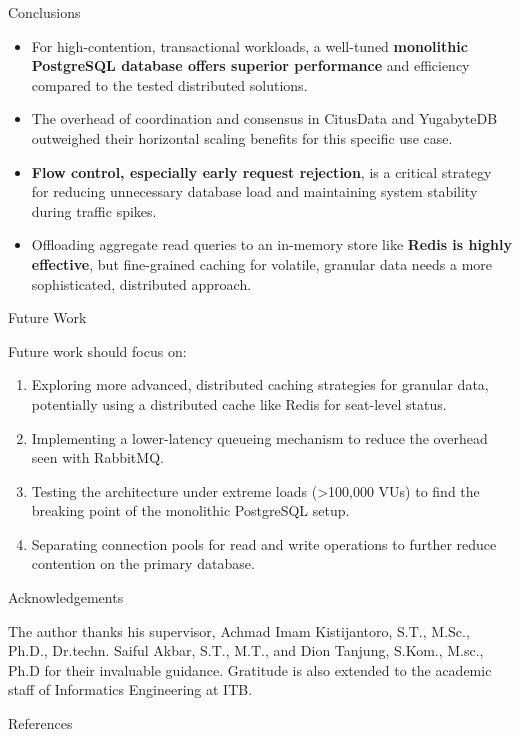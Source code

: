\documentclass[a0,landscape]{config/poster/a0poster}
\newcommand{\postersection}[1]{%
  \begin{tcolorbox}[
    colback=IEEEblue,
    colframe=IEEEblue,
    fonttitle=\bfseries,
    coltext=white,
    sharp corners,
    boxrule=0pt,
    top=4pt,
    bottom=4pt,
    halign=center
  ]
    \large #1
  \end{tcolorbox}%
}
\begin{document}
\begin{multicols}{4}

    \columnbreak

    \postersection{Conclusions}
    \begin{itemize}
        \item For high-contention, transactional workloads, a well-tuned \textbf{monolithic PostgreSQL database offers superior performance} and efficiency compared to the tested distributed solutions.
        \item The overhead of coordination and consensus in CitusData and YugabyteDB outweighed their horizontal scaling benefits for this specific use case.
        \item \textbf{Flow control, especially early request rejection}, is a critical strategy for reducing unnecessary database load and maintaining system stability during traffic spikes.
        \item Offloading aggregate read queries to an in-memory store like \textbf{Redis is highly effective}, but fine-grained caching for volatile, granular data needs a more sophisticated, distributed approach.
    \end{itemize}


    \postersection{Future Work}
    Future work should focus on:
    \begin{enumerate}
        \item Exploring more advanced, distributed caching strategies for granular data, potentially using a distributed cache like Redis for seat-level status.
        \item Implementing a lower-latency queueing mechanism to reduce the overhead seen with RabbitMQ.
        \item Testing the architecture under extreme loads (\textgreater100,000 VUs) to find the breaking point of the monolithic PostgreSQL setup.
        \item Separating connection pools for read and write operations to further reduce contention on the primary database.
    \end{enumerate}

    \postersection{Acknowledgements}
    The author thanks his supervisor, Achmad Imam Kistijantoro, S.T., M.Sc., Ph.D., Dr.techn. Saiful Akbar, S.T., M.T., and Dion Tanjung, S.Kom., M.sc., Ph.D for their invaluable guidance. Gratitude is also extended to the academic staff of Informatics Engineering at ITB.


    \postersection{References}
    \printbibliography[heading=none]

\end{multicols}
\end{document}
